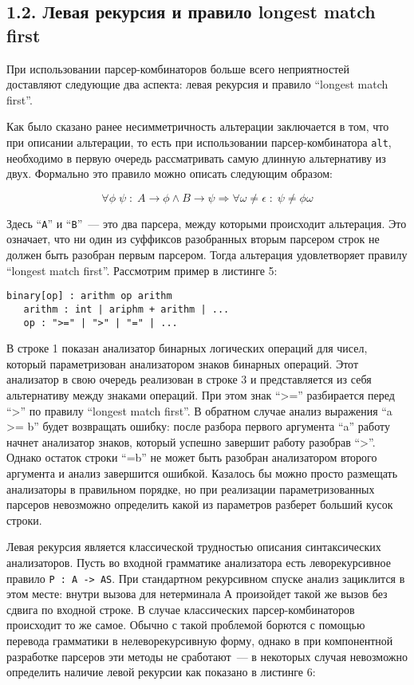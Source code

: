 \subsection*{1.2. Левая рекурсия и правило longest match first}

При использовании парсер-комбинаторов больше всего неприятностей доставляют следующие два аспекта: левая рекурсия и правило ``longest match first''.

Как было сказано ранее несимметричность альтерации заключается в том, что при описании альтерации, то есть при использовании парсер-комбинатора \lstinline|alt|, необходимо в первую очередь рассматривать самую длинную альтернативу из двух. Формально это правило можно описать следующим образом:

\[
\forall\phi\;\psi\;:\; A\rightarrow\phi \wedge B\rightarrow\psi \Rightarrow \forall\omega\ne\epsilon\;:\;\psi\ne\phi\omega
\]

Здесь ``\lstinline|A|'' и ``\lstinline|B|''~--- это два парсера, между которыми происходит альтерация.
Это означает, что ни один из суффиксов разобранных вторым парсером строк не должен быть разобран первым парсером. Тогда альтерация удовлетворяет правилу ``longest match first''.
Рассмотрим пример в листинге 5:

\begin{lstlisting}[basicstyle=\small, caption=``Longest match first'']
   binary[op] : arithm op arithm
   arithm : int | ariphm + arithm | ...
   op : ">=" | ">" | "=" | ...
\end{lstlisting}

В строке 1 показан анализатор бинарных логических операций для чисел, который параметризован анализатором знаков бинарных операций. Этот анализатор в свою очередь реализован в строке 3 и представляется из себя альтернативу между знаками операций. При этом знак ``>='' разбирается перед ``>'' по правилу ``longest match first''. В обратном случае анализ выражения ``a >= b'' будет возвращать ошибку: после разбора первого аргумента ``a'' работу начнет анализатор знаков, который успешно завершит работу разобрав ``>''. Однако остаток строки ``=b'' не может быть разобран анализатором второго аргумента и анализ завершится ошибкой. Казалось бы можно просто размещать анализаторы в правильном порядке, но при реализации параметризованных парсеров невозможно определить какой из параметров разберет больший кусок строки.

Левая рекурсия является классической трудностью описания синтаксических анализаторов. Пусть во входной грамматике анализатора есть леворекурсивное правило \lstinline|P : A -> AS|. При стандартном рекурсивном спуске анализ зациклится в этом месте: внутри вызова для нетерминала А произойдет такой же вызов без сдвига по входной строке. В случае классических парсер-комбинаторов происходит то же самое. Обычно с такой проблемой борются с помощью перевода грамматики в нелеворекурсивную форму, однако в при компонентной разработке парсеров эти методы не сработают~--- в некоторых случая невозможно определить наличие левой рекурсии как показано в листинге 6:

